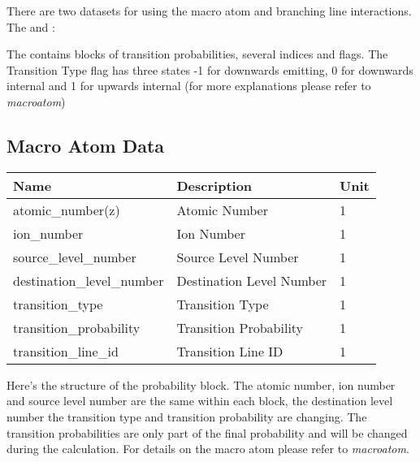 \documentclass[letterpaper,10pt,english]{sphinxmanual}
\begin{document}
There are two datasets for using the macro atom and branching line interactions. The  and :

The  contains blocks of transition probabilities, several indices and flags. The Transition Type flag
has three states -1 for downwards emitting, 0 for downwards internal and 1 for upwards internal (for more explanations please
refer to \emph{macroatom})


\subsection{Macro Atom Data}
\label{atomic:macro-atom-data}
\begin{tabulary}{\linewidth}{|L|L|L|}
\hline
\textbf{
Name
} & \textbf{
Description
} & \textbf{
Unit
}\\\hline

atomic\_number(z)
 & 
Atomic Number
 & 
1
\\\hline

ion\_number
 & 
Ion Number
 & 
1
\\\hline

source\_level\_number
 & 
Source Level Number
 & 
1
\\\hline

destination\_level\_number
 & 
Destination Level Number
 & 
1
\\\hline

transition\_type
 & 
Transition Type
 & 
1
\\\hline

transition\_probability
 & 
Transition Probability
 & 
1
\\\hline

transition\_line\_id
 & 
Transition Line ID
 & 
1
\\\hline
\end{tabulary}


Here's the structure of the probability block. The atomic number, ion number and source level number are the same
within each block, the destination level number the transition type and transition probability are changing.
The transition probabilities are only part of the final probability and will be changed during the calculation.
For details on the macro atom please refer to \emph{macroatom}.
\end{document}
